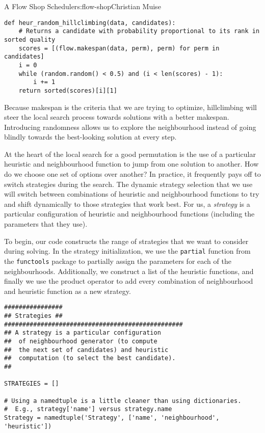 \begin{aosachapter}{A Flow Shop Scheduler}{s:flow-shop}{Christian Muise}
\begin{verbatim}
def heur_random_hillclimbing(data, candidates):
    # Returns a candidate with probability proportional to its rank in sorted quality
    scores = [(flow.makespan(data, perm), perm) for perm in candidates]
    i = 0
    while (random.random() < 0.5) and (i < len(scores) - 1):
        i += 1
    return sorted(scores)[i][1]
\end{verbatim}

Because makespan is the criteria that we are trying to optimize,
hillclimbing will steer the local search process towards solutions with
a better makespan. Introducing randomness allows us to explore the
neighbourhood instead of going blindly towards the best-looking solution
at every step.

\label{dynamic-strategy-selection}

At the heart of the local search for a good permutation is the use of a
particular heuristic and neighbourhood function to jump from one
solution to another. How do we choose one set of options over another?
In practice, it frequently pays off to switch strategies during the
search. The dynamic strategy selection that we use will switch between
combinations of heuristic and neighbourhood functions to try and shift
dynamically to those strategies that work best. For us, a
\emph{strategy} is a particular configuration of heuristic and
neighbourhood functions (including the parameters that they use).

To begin, our code constructs the range of strategies that we want to
consider during solving. In the strategy initialization, we use the
\texttt{partial} function from the \texttt{functools} package to
partially assign the parameters for each of the neighbourhoods.
Additionally, we construct a list of the heuristic functions, and
finally we use the product operator to add every combination of
neighbourhood and heuristic function as a new strategy.

\begin{verbatim}
################
## Strategies ##
#################################################
## A strategy is a particular configuration
##  of neighbourhood generator (to compute
##  the next set of candidates) and heuristic
##  computation (to select the best candidate).
##

STRATEGIES = []

# Using a namedtuple is a little cleaner than using dictionaries.
#  E.g., strategy['name'] versus strategy.name
Strategy = namedtuple('Strategy', ['name', 'neighbourhood', 'heuristic'])


\end{verbatim}
\end{aosachapter}
